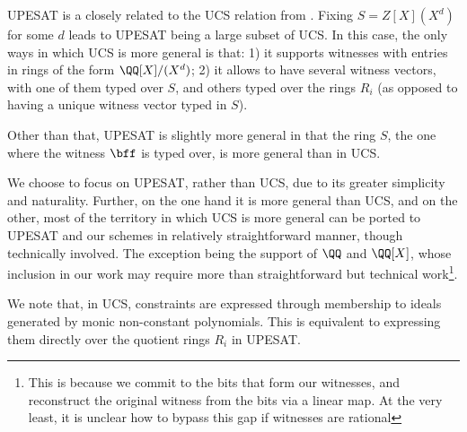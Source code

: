 \begin{remark}\label{r:pimsat_vs_ucs}
UPESAT is a closely related to the  UCS relation from \cite{zincplus}. Fixing $S=Z[X](X^d)$ for some $d$ leads to UPESAT being a large subset of UCS. In this case, the only  ways in which UCS is more general is that: 1) it supports witnesses with entries in rings of the form  $\QQ[X]/(X^d)$; 2) it allows to have several witness vectors, with one of them typed over $S$, and others typed over the rings $R_i$ (as opposed to  having a unique witness vector typed in $S$).

Other than that, UPESAT is slightly more general in that the ring $S$, the one  where the witness $\bff$ is typed over, is more general than in UCS. 

We choose to focus on UPESAT, rather than UCS, due to its greater simplicity and naturality. Further, on the one hand it is more general than UCS, and on the other, most of the territory in which UCS  is more general can be ported to UPESAT and our schemes in relatively straightforward manner, though technically involved. The exception being the support of $\QQ$ and $\QQ[X]$, whose inclusion in our work may require more than straightforward but technical work\footnote{This is because we commit to the bits that form our witnesses, and reconstruct the original witness from the bits via a linear map. At the very least, it is unclear how to bypass this gap if witnesses are rational }.


We note that, in UCS, constraints are expressed through membership to ideals generated by monic non-constant polynomials. This is equivalent to expressing them directly over the quotient rings $R_i$ in UPESAT. 
%
\end{remark}







